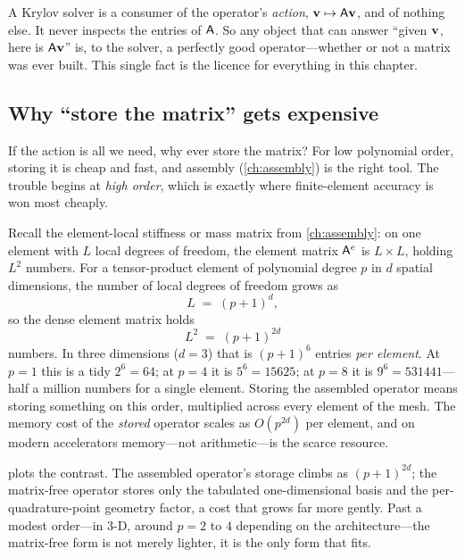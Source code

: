 \begin{keyidea}
A Krylov solver is a consumer of the operator's \emph{action}, $\mathbf{v}\mapsto
\mathsf{A}\mathbf{v}$, and of nothing else. It never inspects the entries of $\mathsf{A}$. So
any object that can answer ``given $\mathbf{v}$, here is $\mathsf{A}\mathbf{v}$'' is, to the
solver, a perfectly good operator---whether or not a matrix was ever built. This
single fact is the licence for everything in this chapter.
\end{keyidea}

\subsection{Why ``store the matrix'' gets expensive}
\label{sec:mf-cost}

If the action is all we need, why ever store the matrix? For low polynomial
order, storing it is cheap and fast, and assembly (\cref{ch:assembly}) is the
right tool. The trouble begins at \emph{high order}, which is exactly where
finite-element accuracy is won most cheaply.

Recall the element-local stiffness or mass matrix from \cref{ch:assembly}: on one
element with $L$ local degrees of freedom, the element matrix $\mathsf{A}^e$ is
$L\times L$, holding $L^2$ numbers. For a tensor-product element of polynomial
degree $p$ in $d$ spatial dimensions, the number of local degrees of freedom
grows as
\[
  L \;=\; (p+1)^d ,
\]
so the dense element matrix holds
\[
  L^2 \;=\; (p+1)^{2d}
\]
numbers. In three dimensions ($d=3$) that is $(p+1)^6$ entries \emph{per element}.
At $p=1$ this is a tidy $2^6 = 64$; at $p=4$ it is $5^6 = \num{15625}$; at $p=8$
it is $9^6 = \num{531441}$---half a million numbers for a single element. Storing
the assembled operator means storing something on this order, multiplied across
every element of the mesh. The memory cost of the \emph{stored} operator scales
as $O(p^{2d})$ per element, and on modern accelerators memory---not
arithmetic---is the scarce resource.

 plots the contrast. The assembled operator's storage climbs
as $(p+1)^{2d}$; the matrix-free operator stores only the tabulated
one-dimensional basis and the per-quadrature-point geometry factor, a cost that
grows far more gently. Past a modest order---in 3-D, around $p=2$ to $4$
depending on the architecture---the matrix-free form is not merely lighter, it is
the only form that fits.


